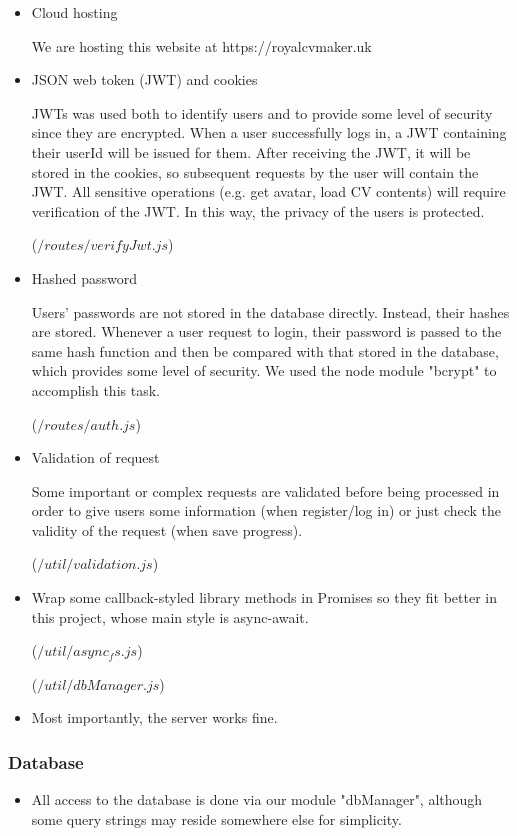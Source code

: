 \documentclass[11pt]{article}
\begin{document}
\begin{spacing}{1.0}
\begin{itemize}
	\item Cloud hosting
	
	We are hosting this website at https://royalcvmaker.uk
	
	\item JSON web token (JWT) and cookies
	
	JWTs was used both to identify users and to provide some level of security since they are encrypted.
	When a user successfully logs in, a JWT containing their userId will be issued for them. After receiving the JWT, it will be stored in the cookies, so subsequent requests by the user will contain the JWT. All sensitive operations (e.g. get avatar, load CV contents) will require verification of the JWT. In this way, the privacy of the users is protected.
	
	($/routes/verifyJwt.js$)

	\item Hashed password
	
	Users' passwords are not stored in the database directly. Instead, their hashes are stored. Whenever a user request to login, their password is passed to the same hash function and then be compared with that stored in the database, which provides some level of security. We used the node module "bcrypt" to accomplish this task.
	
	($/routes/auth.js$)
	
	\item Validation of request
	
	Some important or complex requests are validated before being processed in order to give users some information (when register/log in) or just check the validity of the request (when save progress). 
	
	($/util/validation.js$)
	
	\item Wrap some callback-styled library methods in Promises so they fit better in this project, whose main style is async-await.
	
	($/util/async_fs.js$)
	
	($/util/dbManager.js$)
	
	\item Most importantly, the server works fine.
	
		\end{itemize}
	\subsubsection{Database}
	\begin{itemize}
	\item All access to the database is done via our module "dbManager", although some query strings may reside somewhere else for simplicity.
	

\end{itemize}
\end{spacing}
\end{document}
